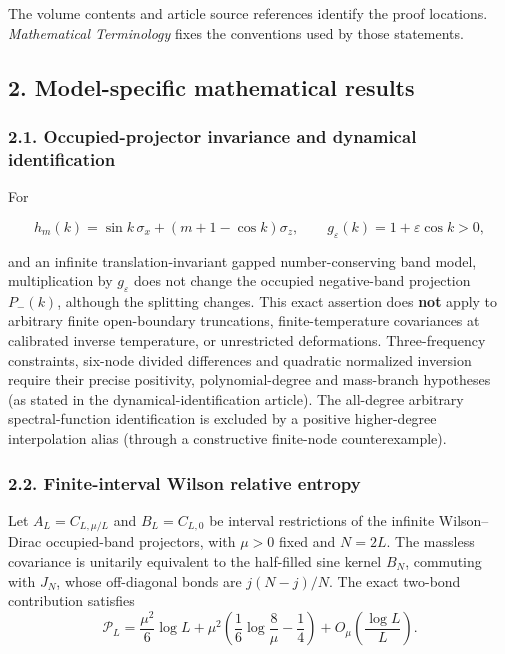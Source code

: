 \documentclass[
  10pt,
  a4paper,
]{article}
\begin{document}
The volume contents and article source references identify the proof locations. \emph{Mathematical Terminology} fixes the conventions used by those statements.

\subsection{2. Model-specific mathematical results}\label{model-specific-mathematical-results}

\subsubsection{2.1. Occupied-projector invariance and dynamical identification}\label{occupied-projector-invariance-and-dynamical-identification}

For

\[
h_m(k)=\sin k\,\sigma_x+(m+1-\cos k)\sigma_z,
\qquad g_\varepsilon(k)=1+\varepsilon\cos k>0,
\]

and an infinite translation-invariant gapped number-conserving band model, multiplication by \(g_\varepsilon\) does not change the occupied negative-band projection \(P_-(k)\), although the splitting changes. This exact assertion does \textbf{not} apply to arbitrary finite open-boundary truncations, finite-temperature covariances at calibrated inverse temperature, or unrestricted deformations. Three-frequency constraints, six-node divided differences and quadratic normalized inversion require their precise positivity, polynomial-degree and mass-branch hypotheses (as stated in the dynamical-identification article). The all-degree arbitrary spectral-function identification is excluded by a positive higher-degree interpolation alias (through a constructive finite-node counterexample).

\subsubsection{2.2. Finite-interval Wilson relative entropy}\label{finite-interval-wilson-relative-entropy}

Let \(A_L=C_{L,\mu/L}\) and \(B_L=C_{L,0}\) be interval restrictions of the infinite Wilson--Dirac occupied-band projectors, with \(\mu>0\) fixed and \(N=2L\). The massless covariance is unitarily equivalent to the half-filled sine kernel \(B_N\), commuting with \(J_N\), whose off-diagonal bonds are \(j(N-j)/N\). The exact two-bond contribution satisfies \[
\boxed{\mathcal P_L=\frac{\mu^2}{6}\log L+
\mu^2\left(\frac16\log\frac8\mu-\frac14\right)
+O_\mu\!\left(\frac{\log L}{L}\right).}
\]
\end{document}
